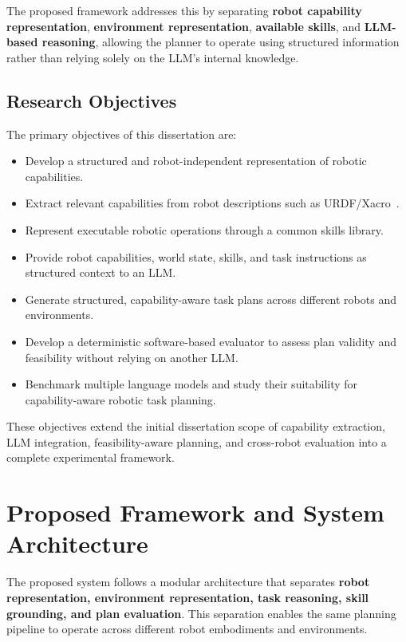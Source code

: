 \documentclass[12pt,a4paper]{article}
\begin{document}
The proposed framework addresses this by separating \textbf{robot capability representation}, \textbf{environment representation}, \textbf{available skills}, and \textbf{LLM-based reasoning}, allowing the planner to operate using structured information rather than relying solely on the LLM's internal knowledge.

\subsection{Research Objectives}

The primary objectives of this dissertation are:

\begin{itemize}
  \item Develop a structured and robot-independent representation of robotic capabilities.
  \item Extract relevant capabilities from robot descriptions such as URDF/Xacro~\cite{urdf}.
  \item Represent executable robotic operations through a common skills library.
  \item Provide robot capabilities, world state, skills, and task instructions as structured context to an LLM.
  \item Generate structured, capability-aware task plans across different robots and environments.
  \item Develop a deterministic software-based evaluator to assess plan validity and feasibility without relying on another LLM.
  \item Benchmark multiple language models and study their suitability for capability-aware robotic task planning.
\end{itemize}

These objectives extend the initial dissertation scope of capability extraction, LLM integration, feasibility-aware planning, and cross-robot evaluation into a complete experimental framework.

\section{Proposed Framework and System Architecture}

The proposed system follows a modular architecture that separates \textbf{robot representation, environment representation, task reasoning, skill grounding, and plan evaluation}.
This separation enables the same planning pipeline to operate across different robot embodiments and environments.
\end{document}
